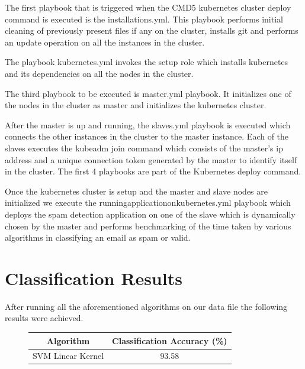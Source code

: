 \documentclass[9pt,twocolumn,twoside]{../../styles/osajnl}
\begin{document}
{\noindent
The first playbook that is triggered when the CMD5 kubernetes cluster
deploy command is executed is the installations.yml. This playbook
performs initial cleaning of previously present files if any on the
cluster, installs git and performs an update operation on all the
instances in the cluster.\newline

\noindent
The playbook kubernetes.yml invokes the setup role which installs
kubernetes and its dependencies on all the nodes in the
cluster. \newline

\noindent
The third playbook to be executed is master.yml playbook. It
initializes one of the nodes in the cluster as master and initializes
the kubernetes cluster.\newline

\noindent
After the master is up and running, the slaves.yml playbook is
executed which connects the other instances in the cluster to the
master instance. Each of the slaves executes the kubeadm join command
which consists of the master's ip address and a unique connection
token generated by the master to identify itself in the cluster. The
first 4 playbooks are part of the Kubernetes deploy command.\newline

\noindent
Once the kubernetes cluster is setup and the master and slave nodes
are initialized we execute the runningapplicationonkubernetes.yml
playbook which deploys the spam detection application on one of the
slave which is dynamically chosen by the master and performs
benchmarking of the time taken by various algorithms in classifying an
email as spam or valid.

\section{Classification Results}

After running all the aforementioned algorithms on our data file the
following results were achieved.

\begin{figure}[ht]
\begin{center}
 \begin{tabular}{|c | c|} 
 \hline
Algorithm  & Classification Accuracy (\%) \\ [0.5ex] 
 \hline\hline
    
SVM Linear Kernel & 93.58 \\
\hline


\end{tabular}
\end{center}
\end{figure}}
\end{document}
